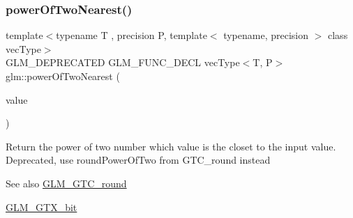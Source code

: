 \subsubsection{\texorpdfstring{power\+Of\+Two\+Nearest()}{powerOfTwoNearest()}\hspace{0.1cm}{\footnotesize\ttfamily [2/2]}}
{\footnotesize\ttfamily template$<$typename T , precision P, template$<$ typename, precision $>$ class vec\+Type$>$ \\
G\+L\+M\+\_\+\+D\+E\+P\+R\+E\+C\+A\+T\+ED G\+L\+M\+\_\+\+F\+U\+N\+C\+\_\+\+D\+E\+CL vec\+Type$<$T, P$>$ glm\+::power\+Of\+Two\+Nearest (\begin{DoxyParamCaption}\item[{vec\+Type$<$ T, P $>$ const \&}]{value }\end{DoxyParamCaption})}

Return the power of two number which value is the closet to the input value. Deprecated, use round\+Power\+Of\+Two from G\+T\+C\+\_\+round instead

\begin{DoxySeeAlso}{See also}
\hyperlink{group__gtc__round}{G\+L\+M\+\_\+\+G\+T\+C\+\_\+round} 

\hyperlink{group__gtx__bit}{G\+L\+M\+\_\+\+G\+T\+X\+\_\+bit} 
\end{DoxySeeAlso}
